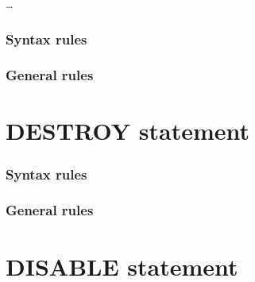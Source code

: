 \begin{syntax}[\miscextcolour]
   
  \begin{1=}
    \filename
  \end{1=} \ldots


\end{syntax}

\subsubsection{Syntax rules}

\subsubsection{General rules}

\section{DESTROY statement}

\begin{syntax}[\miscextcolour]
\end{syntax}

\subsubsection{Syntax rules}

\subsubsection{General rules}

\section{DISABLE statement}

